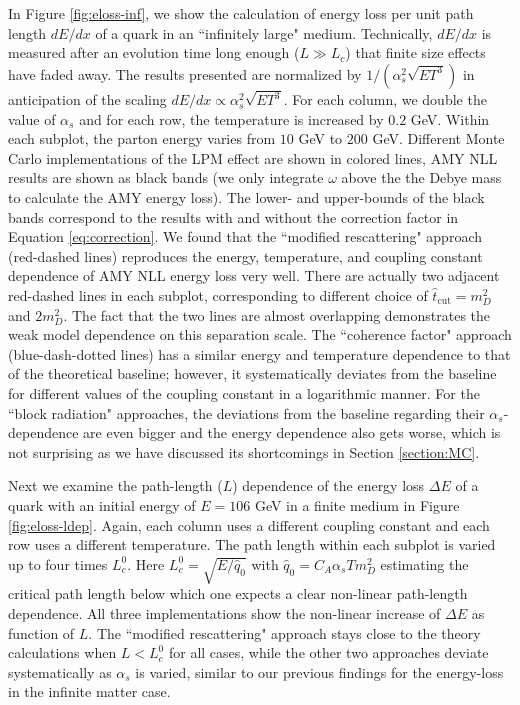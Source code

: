 In Figure \ref{fig:eloss-inf}, we show the calculation of energy loss per unit path length $dE/dx$ of a quark in an ``infinitely large" medium. 
Technically, $dE/dx$ is measured after an evolution time long enough ($L\gg L_c$) that finite size effects have faded away.
The results presented are normalized by $1/(\alpha_s^2 \sqrt{ET^3})$ in anticipation of the scaling $dE/dx \propto \alpha_s^2 \sqrt{ET^3}$.
For each column, we double the value of $\alpha_s$ and for each row, the temperature is increased by $0.2$ GeV. 
Within each subplot, the parton energy varies from $10$ GeV to $200$ GeV.
Different Monte Carlo implementations of the LPM effect are shown in colored lines, AMY NLL results are shown as black bands (we only integrate $\omega$ above the the Debye mass to calculate the AMY energy loss). 
The lower- and upper-bounds of the black bands correspond to the results with and without the correction factor in Equation \ref{eq:correction}.
We found that the ``modified rescattering" approach (red-dashed lines) reproduces the energy, temperature, and coupling constant dependence of AMY NLL energy loss very well.
There are actually two adjacent red-dashed lines in each subplot, corresponding to different choice of $\hat{t}_{\textrm{cut}}=m_D^2$ and $2 m_D^2$. 
The fact that the two lines are almost overlapping demonstrates the weak model dependence on this separation scale.
The ``coherence factor" approach (blue-dash-dotted lines) has a similar energy and temperature dependence to that of the theoretical baseline; however, it systematically deviates from the baseline for different values of the coupling constant in a logarithmic manner.
For the ``block radiation" approaches, the deviations from the baseline regarding their $\alpha_s$-dependence are even bigger and the energy dependence also gets worse, which is not surprising as we have discussed its shortcomings in Section \ref{section:MC}.

Next we examine the path-length ($L$) dependence of the energy loss $\Delta E$ of a quark with an initial energy of $E = 106$ GeV in a finite medium in Figure \ref{fig:eloss-ldep}.
Again, each column uses a different coupling constant and each row uses a different temperature. 
The path length within each subplot is varied up to four times $L_c^0$.
Here $L_c^0 = \sqrt{E/\hat{q}_0}$ with $\hat{q}_0 = C_A \alpha_s T m_D^2$ estimating the critical path length below which one expects a clear non-linear path-length dependence.
All three implementations show the non-linear increase of $\Delta E$ as function of $L$.
The ``modified rescattering" approach stays close to the theory calculations when $L<L_c^0$ for all cases, while the other two approaches deviate systematically as $\alpha_s$ is varied, similar to our previous findings for the energy-loss in the infinite matter case.
